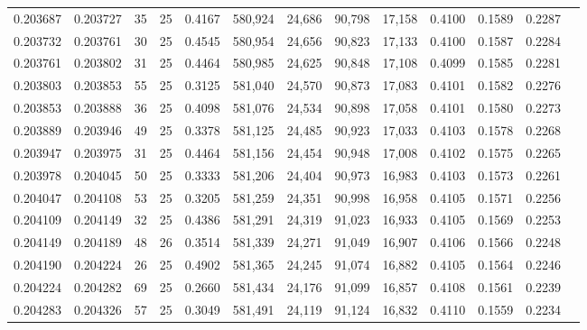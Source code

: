 \begin{tabular}{rrrrrrrrrrrrr}
0.203687 & 0.203727 &  35 &  25 &                                     0.4167 & 580,924 &  24,686 &  90,798 &  17,158 & 0.4100 & 0.1589 & 0.2287 \\
0.203732 & 0.203761 &  30 &  25 &                                     0.4545 & 580,954 &  24,656 &  90,823 &  17,133 & 0.4100 & 0.1587 & 0.2284 \\
0.203761 & 0.203802 &  31 &  25 &                                     0.4464 & 580,985 &  24,625 &  90,848 &  17,108 & 0.4099 & 0.1585 & 0.2281 \\
0.203803 & 0.203853 &  55 &  25 &                                     0.3125 & 581,040 &  24,570 &  90,873 &  17,083 & 0.4101 & 0.1582 & 0.2276 \\
0.203853 & 0.203888 &  36 &  25 &                                     0.4098 & 581,076 &  24,534 &  90,898 &  17,058 & 0.4101 & 0.1580 & 0.2273 \\
0.203889 & 0.203946 &  49 &  25 &                                     0.3378 & 581,125 &  24,485 &  90,923 &  17,033 & 0.4103 & 0.1578 & 0.2268 \\
0.203947 & 0.203975 &  31 &  25 &                                     0.4464 & 581,156 &  24,454 &  90,948 &  17,008 & 0.4102 & 0.1575 & 0.2265 \\
0.203978 & 0.204045 &  50 &  25 &                                     0.3333 & 581,206 &  24,404 &  90,973 &  16,983 & 0.4103 & 0.1573 & 0.2261 \\
0.204047 & 0.204108 &  53 &  25 &                                     0.3205 & 581,259 &  24,351 &  90,998 &  16,958 & 0.4105 & 0.1571 & 0.2256 \\
0.204109 & 0.204149 &  32 &  25 &                                     0.4386 & 581,291 &  24,319 &  91,023 &  16,933 & 0.4105 & 0.1569 & 0.2253 \\
0.204149 & 0.204189 &  48 &  26 &                                     0.3514 & 581,339 &  24,271 &  91,049 &  16,907 & 0.4106 & 0.1566 & 0.2248 \\
0.204190 & 0.204224 &  26 &  25 &                                     0.4902 & 581,365 &  24,245 &  91,074 &  16,882 & 0.4105 & 0.1564 & 0.2246 \\
0.204224 & 0.204282 &  69 &  25 &                                     0.2660 & 581,434 &  24,176 &  91,099 &  16,857 & 0.4108 & 0.1561 & 0.2239 \\
0.204283 & 0.204326 &  57 &  25 &                                     0.3049 & 581,491 &  24,119 &  91,124 &  16,832 & 0.4110 & 0.1559 & 0.2234 \\

\end{tabular}
